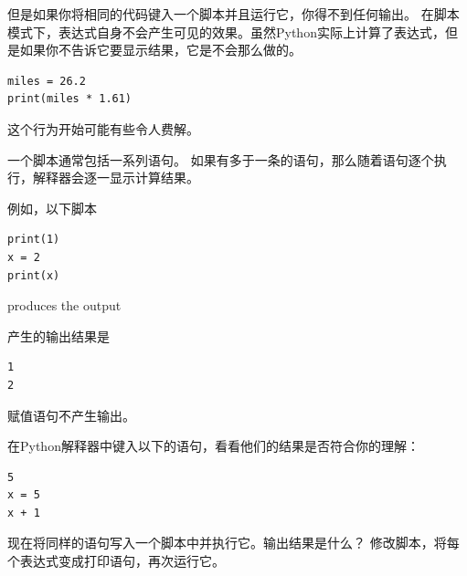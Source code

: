 
但是如果你将相同的代码键入一个脚本并且运行它，你得不到任何输出。 在脚本模式下，表达式自身不会产生可见的效果。虽然Python实际上计算了表达式，但是如果你不告诉它要显示结果，它是不会那么做的。

\begin{lstlisting}
miles = 26.2
print(miles * 1.61)
\end{lstlisting}


这个行为开始可能有些令人费解。

一个脚本通常包括一系列语句。 如果有多于一条的语句，那么随着语句逐个执行，解释器会逐一显示计算结果。

例如，以下脚本

\begin{lstlisting}
print(1)
x = 2
print(x)
\end{lstlisting}

%
produces the output

产生的输出结果是

\begin{lstlisting}
1
2
\end{lstlisting}

%


赋值语句不产生输出。

在Python解释器中键入以下的语句，看看他们的结果是否符合你的理解：

\begin{lstlisting}
5
x = 5
x + 1
\end{lstlisting}


现在将同样的语句写入一个脚本中并执行它。输出结果是什么？ 修改脚本，将每个表达式变成打印语句，再次运行它。

